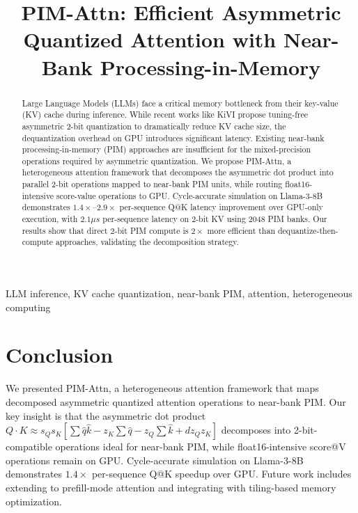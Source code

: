 \documentclass[conference]{IEEEtran}
\newcommand{\pimattn}{PIM-Attn}
\newcommand{\kivi}{KiVI}
\begin{document}
\title{\pimattn{}: Efficient Asymmetric Quantized Attention with Near-Bank Processing-in-Memory}

\author{
}

\maketitle

\begin{abstract}
Large Language Models (LLMs) face a critical memory bottleneck from their key-value (KV) cache during inference.
While recent works like \kivi{} propose tuning-free asymmetric 2-bit quantization to dramatically reduce KV cache size, the dequantization overhead on GPU introduces significant latency.
Existing near-bank processing-in-memory (PIM) approaches are insufficient for the mixed-precision operations required by asymmetric quantization.
We propose \pimattn{}, a heterogeneous attention framework that decomposes the asymmetric dot product into parallel 2-bit operations mapped to near-bank PIM units, while routing float16-intensive score-value operations to GPU.
Cycle-accurate simulation on Llama-3-8B demonstrates $1.4\times$--$2.9\times$ per-sequence Q@K latency improvement over GPU-only execution, with $2.1\mu s$ per-sequence latency on 2-bit KV using 2048 PIM banks.
Our results show that direct 2-bit PIM compute is $2\times$ more efficient than dequantize-then-compute approaches, validating the decomposition strategy.
\end{abstract}

\begin{IEEEkeywords}
LLM inference, KV cache quantization, near-bank PIM, attention, heterogeneous computing
\end{IEEEkeywords}







\section{Conclusion}
We presented \pimattn{}, a heterogeneous attention framework that maps decomposed asymmetric quantized attention operations to near-bank PIM. Our key insight is that the asymmetric dot product $Q\cdot K \approx s_Q s_K[\sum \hat{q}\hat{k} - z_K\sum\hat{q} - z_Q\sum\hat{k} + d z_Q z_K]$ decomposes into 2-bit-compatible operations ideal for near-bank PIM, while float16-intensive score@V operations remain on GPU. Cycle-accurate simulation on Llama-3-8B demonstrates $1.4\times$ per-sequence Q@K speedup over GPU. Future work includes extending to prefill-mode attention and integrating with tiling-based memory optimization.



\end{document}

